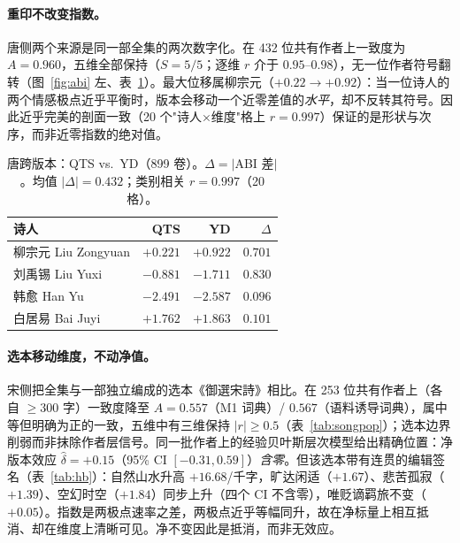 \documentclass[11pt]{article}
\begin{document}
\paragraph{重印不改变指数。}唐侧两个来源是同一部全集的两次数字化。在 432 位共有作者上一致度为 $A{=}0.960$，五维全部保持（$S{=}5/5$；逐维 $r$ 介于 $0.95$–$0.98$），无一位作者符号翻转（图~\ref{fig:abi} 左、表~\ref{tab:tang}）。最大位移属柳宗元（$+0.22\to+0.92$）：当一位诗人的两个情感极点近乎平衡时，版本会移动一个近零差值的\emph{水平}，却不反转其符号。因此近乎完美的剖面一致（20 个"诗人×维度"格上 $r{=}0.997$）保证的是形状与次序，而非近零指数的绝对值。

\begin{table}[H]
\centering\small
\caption{唐跨版本：QTS vs.\ YD（899 卷）。$\Delta{=}|$ABI 差$|$。均值 $|\Delta|{=}0.432$；类别相关 $r{=}0.997$（20 格）。}
\label{tab:tang}
\begin{tabular}{lrrr}
\toprule
诗人 & QTS & YD & $\Delta$\\
\midrule
柳宗元 Liu Zongyuan & $+0.221$ & $+0.922$ & $0.701$\\
刘禹锡 Liu Yuxi & $-0.881$ & $-1.711$ & $0.830$\\
韩愈 Han Yu & $-2.491$ & $-2.587$ & $0.096$\\
白居易 Bai Juyi & $+1.762$ & $+1.863$ & $0.101$\\
\bottomrule
\end{tabular}
\end{table}

\paragraph{选本移动维度，不动净值。}宋侧把全集与一部独立编成的选本《御選宋詩》相比。在 253 位共有作者上（各自 $\ge300$ 字）一致度降至 $A{=}0.557$（M1 词典）/ $0.567$（语料诱导词典），属中等但明确为正的一致，五维中有三维保持 $|r|\ge0.5$（表~\ref{tab:songpop}）；选本边界削弱而非抹除作者层信号。同一批作者上的经验贝叶斯层次模型给出精确位置：净版本效应 $\hat\delta{=}+0.15$（95\% CI $[-0.31,0.59]$）\emph{含零}。但该选本带有连贯的编辑签名（表~\ref{tab:hb}）：自然山水升高 $+16.68$/千字，旷达闲适（$+1.67$）、悲苦孤寂（$+1.39$）、空幻时空（$+1.84$）同步上升（四个 CI 不含零），唯贬谪羁旅不变（$+0.05$）。指数是两极点速率之差，两极点近乎等幅同升，故在净标量上相互抵消、却在维度上清晰可见。净不变因此是抵消，而非无效应。
\end{document}
